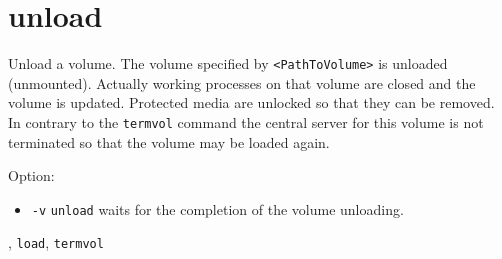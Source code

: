 \section{unload}
\begin{man}
  \PP Unload a volume.
  \DE The volume specified by {\tt <PathToVolume>} is unloaded
             (unmounted). Actually working processes on that volume are closed
             and the volume is updated. Protected media are unlocked so that
             they can be removed. In contrary to the {\tt termvol} command the
             central server for this volume is not terminated so that the 
             volume may be loaded again.

             Option:

             \begin{itemize}
             \item {\tt -v}\newline
               {\tt unload} waits for the completion of the volume unloading.
             \end{itemize}

  , {\tt load}, {\tt termvol}
\end{man}
